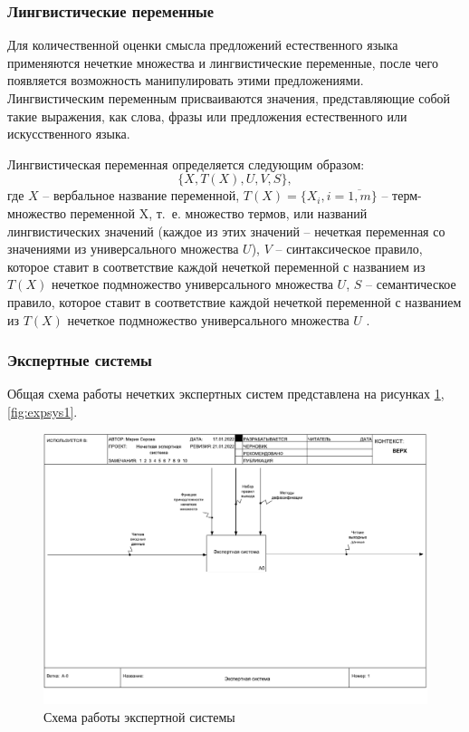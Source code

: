 \subsubsection{Лингвистические переменные}
Для количественной оценки смысла предложений естественного языка применяются нечеткие множества и лингвистические переменные, после чего появляется возможность манипулировать этими предложениями. Лингвистическим переменным присваиваются значения, представляющие собой такие выражения, как слова, фразы или предложения естественного или искусственного языка.

Лингвистическая переменная определяется следующим образом:
\begin{equation}
\{X, T(X), U, V, S\},
\end{equation}
где $X$ -- вербальное название переменной, $T(X) = \{X_{i}, i=\overline{1, m}\}$ -- терм-множество переменной X, т.~е. множество термов, или названий лингвистических значений (каждое из этих значений -- нечеткая переменная со значениями из универсального множества $U$), $V$ -- синтаксическое правило, которое ставит в соответствие каждой нечеткой переменной с названием из $T(X)$ нечеткое подмножество универсального множества $U$, $S$ -- семантическое правило, которое ставит в соответствие каждой нечеткой переменной с названием из $T(X)$ нечеткое подмножество универсального множества $U$ \cite{IncrEfficiency}.

\subsubsection{Экспертные системы}
Общая схема работы нечетких экспертных систем представлена на рисунках \ref{fig:expsys0}, \ref{fig:expsys1}.
\begin{figure}[H]
	\centering
	\includegraphics[width=0.75\linewidth]{img/expsys0}
	\caption{Схема работы экспертной системы}
	\label{fig:expsys0}
\end{figure}


